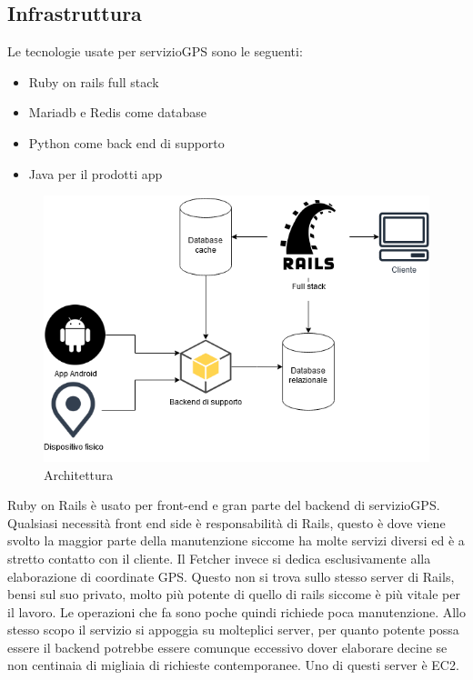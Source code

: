 \documentclass[12pt]{article}
\begin{document}
\subsection{Infrastruttura}
Le tecnologie usate per servizioGPS sono le seguenti:
\begin{itemize}
  \item Ruby on rails full stack
  \item Mariadb e Redis come database
  \item Python come back end di supporto
  \item Java per il prodotti app 
\end{itemize}
\begin{figure}[H]
\includegraphics[scale = 0.6]{infrastructure.png}
\caption{Architettura}
\end{figure}
Ruby on Rails è usato per front-end e gran parte del backend di servizioGPS. 
Qualsiasi necessità front end side è responsabilità di Rails, questo è dove 
viene svolto la maggior parte della manutenzione siccome ha molte servizi diversi 
ed è a stretto contatto con il cliente.
Il Fetcher invece si dedica esclusivamente alla elaborazione di coordinate GPS. 
Questo non si trova sullo stesso server di Rails, bensi sul suo privato, molto 
più potente di quello di rails siccome è più vitale per il lavoro.
Le operazioni che fa sono poche quindi richiede poca manutenzione. 
Allo stesso scopo il servizio si appoggia su molteplici server, per quanto 
potente possa essere il backend potrebbe essere comunque eccessivo dover 
elaborare decine se non centinaia di migliaia di richieste contemporanee.
Uno di questi server è EC2.
\end{document}
